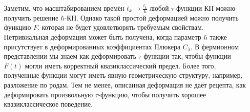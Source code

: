 \documentclass[a4paper,14pt]{extarticle}
\numberwithin{equation}{section}
\begin{document}
Заметим, что масштабированием времён $t_k \to \frac{t_k}{\hbar }$ 
любой $\tau$-функции КП можно получить решение $\hbar $-КП.
Однако такой простой деформацией можно получить функцию $F$,
которая не будет удовлетворять требуемым свойствам.
Нетривиальная деформация может быть получена, когда параметр
$\hbar $ также присутствует в деформированных коэффициентах
Плюкера $C_\lambda$. В фермионном
представлении мы знаем как деформировать $\tau$-функции так,
чтобы функции $F(t)$ могли иметь корректный квазиклассический
предел. Более того, полученные функции могут иметь явную геометрическую структуру, например, разложение по родам.
Тем не менее, описанная деформация не даёт рецепта, как
деформировать произвольную  $\tau$-функцию, чтобы получить
хорошее квазиклассическое поведение.
%
\end{document}
